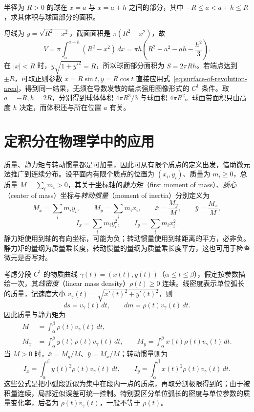 \begin{example}
\label{ex:spherical-zone-volume-and-area}
半径为 $R>0$ 的球在 $x=a$ 与 $x=a+h$ 之间的部分，其中 $-R\leq a<a+h\leq R$，求其体积与球面部分的面积。
\end{example}
\begin{solve}
母线为 $y=\sqrt{R^2-x^2}$，截面面积是 $\pi(R^2-x^2)$，故
\[
    V=\pi\int_a^{a+h}(R^2-x^2)\,dx
    =\pi h\left(R^2-a^2-ah-\frac{h^2}{3}\right).
\]
在 $|x|<R$ 时，$y\sqrt{1+y'^2}=R$，所以球面部分面积为 $S=2\pi Rh$。若端点达到 $\pm R$，可取正则参数 $x=R\sin t,y=R\cos t$ 直接应用式~\eqref{eq:surface-of-revolution-area}，得到同一结果，无须在导数发散的端点强用图像形式的 $C^1$ 条件。取 $a=-R,h=2R$，分别得到球体体积 $4\pi R^3/3$ 与球面积 $4\pi R^2$。球面带面积只由高度 $h$ 决定，而体积还与所在位置 $a$ 有关。
\end{solve}

\section{定积分在物理学中的应用}
\label{sec:physical-applications-of-definite-integrals}

质量、静力矩与转动惯量都是可加量，因此可从有限个质点的定义出发，借助微元法推广到连续分布。设平面内有限个质点的位置为 $(x_i,y_i)$、质量为 $m_i\geq0$，总质量 $M=\sum_i m_i>0$，其关于坐标轴的\emph{静力矩}（first moment of mass）、\emph{质心}（center of mass）坐标与\emph{转动惯量}（moment of inertia）分别定义为
\[
    M_x=\sum_i m_i y_i,\qquad M_y=\sum_i m_i x_i,\qquad
    \bar x=\frac{M_y}{M},\qquad \bar y=\frac{M_x}{M},
\]
\[
    I_x=\sum_i m_i y_i^2,\qquad I_y=\sum_i m_i x_i^2.
\]
静力矩使用到轴的有向坐标，可能为负；转动惯量使用到轴距离的平方，必非负。静力矩的量纲为质量乘长度，转动惯量的量纲为质量乘长度平方，这也可用于检查微元是否写对。

考虑分段 $C^1$ 的物质曲线 $\gamma(t)=(x(t),y(t))$（$\alpha\leq t\leq\beta$），假定按参数描绘一次，其\emph{线密度}（linear mass density）$\rho(t)\geq0$ 连续。线密度表示单位弧长的质量，记速度大小 $v_\gamma(t)=\sqrt{x'(t)^2+y'(t)^2}$，则
\[
    ds=v_\gamma(t)\,dt,\qquad dm=\rho(t)v_\gamma(t)\,dt.
\]
因此质量与静力矩为
\begin{equation}
    \begin{aligned}
        M&=\int_\alpha^\beta\rho(t)v_\gamma(t)\,dt,\\
        M_x&=\int_\alpha^\beta y(t)\rho(t)v_\gamma(t)\,dt,\qquad
        M_y=\int_\alpha^\beta x(t)\rho(t)v_\gamma(t)\,dt.
    \end{aligned}
    \label{eq:curve-mass-and-first-moments}
\end{equation}
当 $M>0$ 时，$\bar x=M_y/M$、$\bar y=M_x/M$；转动惯量则为
\begin{equation}
    I_x=\int_\alpha^\beta y(t)^2\rho(t)v_\gamma(t)\,dt,\qquad
    I_y=\int_\alpha^\beta x(t)^2\rho(t)v_\gamma(t)\,dt.
    \label{eq:curve-moments-of-inertia}
\end{equation}
这些公式是把小弧段近似为集中在段内一点的质点，再取分割极限得到的；由于被积量连续，局部近似误差可统一控制。特别要区分单位弧长的密度与单位参数的质量变化率，后者为 $\rho(t)v_\gamma(t)$，一般不等于 $\rho(t)$。

